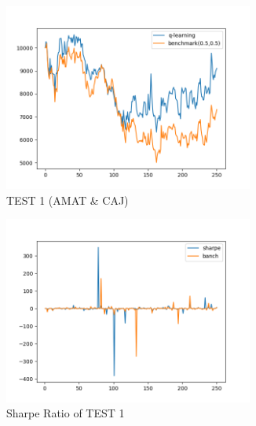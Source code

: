 \begin{figure}[H]
\vspace{0.4cm}

\begin{subfigure}{.5\textwidth}%
\centering
\includegraphics[clip, width=0.9\textwidth]{Graphics/TESTAC3Dby10train.png} \caption{TEST 1 (AMAT \& CAJ)} 
\end{subfigure}%
\begin{subfigure}{.5\textwidth}%
\centering
\includegraphics[clip, width=0.9\textwidth]{Graphics/TESTAC3Dby10trainS.png} \caption{Sharpe Ratio of TEST 1}
\end{subfigure}%
\vspace{0.4cm}
\begin{subfigure}{.5\textwidth}%
\centering

\end{subfigure}
\end{figure}
